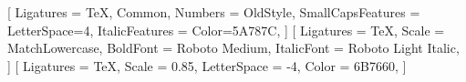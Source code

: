 %
%

\usepackage[english]{babel}
\usepackage[english=american]{csquotes}

\usepackage{amsmath}
\usepackage{amssymb}
\usepackage{mathtools}

%
\setmainfont{EB Garamond}[
  Ligatures         = {TeX, Common},
  Numbers           = OldStyle,
  SmallCapsFeatures = {LetterSpace=4},
  ItalicFeatures    = {Color=5A787C},
]
\setsansfont{Roboto Light}[
  Ligatures   = TeX,
  Scale       = MatchLowercase,
  BoldFont    = {Roboto Medium},
  ItalicFont  = {Roboto Light Italic},
]
%
\setmonofont{Fira Mono}[
  Ligatures   = TeX,
  Scale       = 0.85,
  LetterSpace = -4,
  Color       = 6B7660,
]

